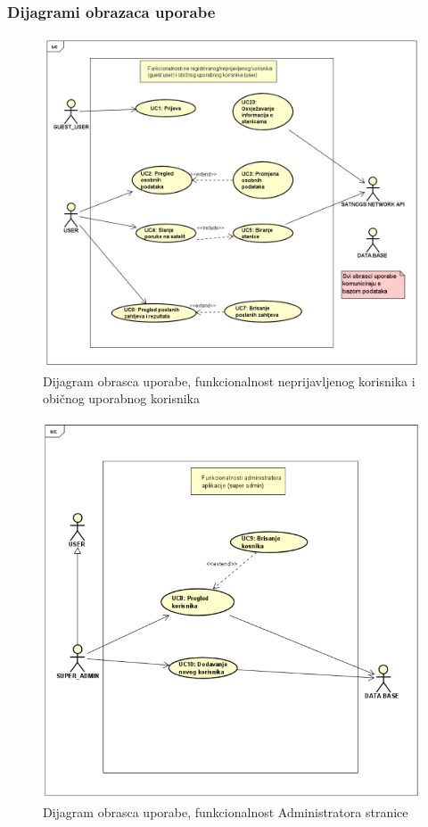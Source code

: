 				\subsubsection{Dijagrami obrazaca uporabe}
					\begin{figure}[H]
						\label{fig:Dijagrami obrazaca uporabe 1-7}
						\includegraphics[width=\linewidth]{USECASE1.png}
						\caption{Dijagram obrasca uporabe, funkcionalnost neprijavljenog korisnika i običnog uporabnog korisnika}
						
					\end{figure}
				\begin{figure}[H]
					\includegraphics[width=\linewidth]{USECASE2.png}
					\caption{Dijagram obrasca uporabe, funkcionalnost Administratora stranice}
					\label{fig:Dijagrami obrazaca uporabe 8-10}
				\end{figure}
